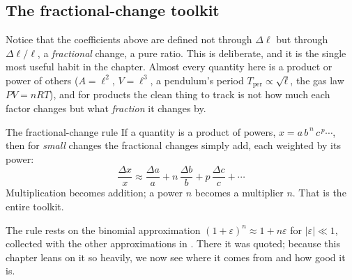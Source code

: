 \subsection{The fractional-change toolkit}\label{sec:fractional}

Notice that the coefficients above are defined not through $\Delta\ell$ but through $\Delta\ell/\ell$, a
\emph{fractional} change, a pure ratio. This is deliberate, and it is the single most useful habit in
the chapter. Almost every quantity here is a product or power of others ($A=\ell^2$, $V=\ell^3$, a
pendulum's period $T_{\text{per}}\propto\sqrt{\ell}$, the gas law $PV=nRT$), and for products the
clean thing to track is not how much each factor changes but what \emph{fraction} it changes by.

\begin{keybox}{The fractional-change rule}
If a quantity is a product of powers, $x = a\,b^{\,n}\,c^{\,p}\cdots$, then for \emph{small} changes
the fractional changes simply add, each weighted by its power:
\[
\boxed{\;\frac{\Delta x}{x} \approx \frac{\Delta a}{a} + n\,\frac{\Delta b}{b} + p\,\frac{\Delta c}{c} + \cdots\;}
\]
Multiplication becomes addition; a power $n$ becomes a multiplier $n$. That is the entire toolkit.
\end{keybox}

The rule rests on the binomial approximation $(1+\varepsilon)^n\approx1+n\varepsilon$ for
$|\varepsilon|\ll1$, collected with the other approximations in . There it was
quoted; because this chapter leans on it so heavily, we now see where it comes from and how good it is.

